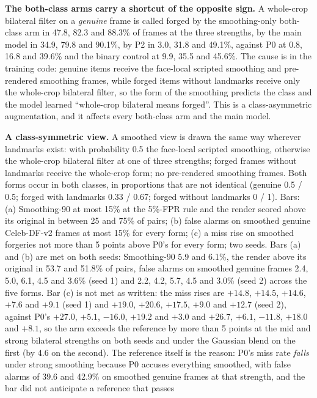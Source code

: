 \documentclass[10pt]{article}
\begin{document}
\textbf{The both-class arms carry a shortcut of the opposite sign.} A whole-crop bilateral filter on a \emph{genuine}
frame is called forged by the smoothing-only both-class arm in 47.8, 82.3 and 88.3\% of frames at the three strengths,
by the main model in 34.9, 79.8 and 90.1\%, by P2 in 3.0, 31.8 and 49.1\%, against P0 at 0.8, 16.8 and 39.6\% and the
binary control at 9.9, 35.5 and 45.6\%. The cause is in the training code: genuine items receive the face-local scripted
smoothing and pre-rendered smoothing frames, while forged items without landmarks receive only the whole-crop bilateral
filter, so the form of the smoothing predicts the class and the model learned ``whole-crop bilateral means forged''.
This is a class-asymmetric augmentation, and it affects every both-class arm and the main model.

\textbf{A class-symmetric view.} A smoothed view is drawn the same way wherever landmarks exist: with probability 0.5
the face-local scripted smoothing, otherwise the whole-crop bilateral filter at one of three strengths; forged frames
without landmarks receive the whole-crop form; no pre-rendered smoothing frames. Both forms occur in both classes, in
proportions that are not identical (genuine 0.5 / 0.5; forged with landmarks 0.33 / 0.67; forged without landmarks 0 /
1). Bars: (a) Smoothing-90 at most 15\% at the 5\%-FPR rule and the render scored above its original in between 25 and
75\% of pairs; (b) false alarms on smoothed genuine Celeb-DF-v2 frames at most 15\% for every form; (c) a miss rise on
smoothed forgeries not more than 5 points above P0's for every form; two seeds. Bars (a) and (b) are met on both seeds:
Smoothing-90 5.9 and 6.1\%, the render above its original in 53.7 and 51.8\% of pairs, false alarms on smoothed genuine
frames 2.4, 5.0, 6.1, 4.5 and 3.6\% (seed 1) and 2.2, 4.2, 5.7, 4.5 and 3.0\% (seed 2) across the five forms. Bar (c) is
not met as written: the miss rises are $+14.8$, $+14.5$, $+14.6$, $+7.6$ and $+9.1$ (seed 1) and $+19.0$, $+20.6$,
$+17.5$, $+9.0$ and $+12.7$ (seed 2), against P0's $+27.0$, $+5.1$, $-16.0$, $+19.2$ and $+3.0$ and $+26.7$, $+6.1$,
$-11.8$, $+18.0$ and $+8.1$, so the arm exceeds the reference by more than 5 points at the mid and strong bilateral
strengths on both seeds and under the Gaussian blend on the first (by 4.6 on the second). The reference itself is the
reason: P0's miss rate \emph{falls} under strong smoothing because P0 accuses everything smoothed, with false alarms of
39.6 and 42.9\% on smoothed genuine frames at that strength, and the bar did not anticipate a reference that passes
\end{document}
